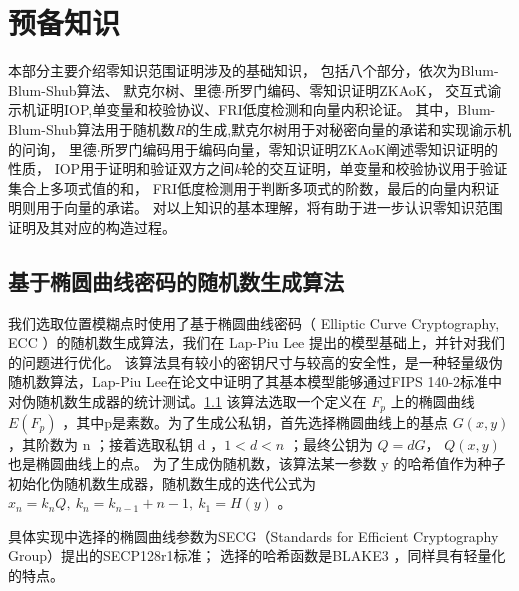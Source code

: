 \documentclass[zihao=-4]{ctexart}
\begin{document}

\section{预备知识}
本部分主要介绍零知识范围证明涉及的基础知识，
包括八个部分，依次为Blum-Blum-Shub算法、
默克尔树、里德$\cdot$所罗门编码、零知识证明ZKAoK，
交互式谕示机证明IOP,单变量和校验协议、FRI低度检测和向量内积论证。
其中，Blum-Blum-Shub算法用于随机数$R$的生成,默克尔树用于对秘密向量的承诺和实现谕示机的问询，
里德$\cdot$所罗门编码用于编码向量，零知识证明ZKAoK阐述零知识证明的性质，
IOP用于证明和验证双方之间$k$轮的交互证明，单变量和校验协议用于验证集合上多项式值的和，
FRI低度检测用于判断多项式的阶数，最后的向量内积证明则用于向量的承诺。
对以上知识的基本理解，将有助于进一步认识零知识范围证明及其对应的构造过程。
\subsection{基于椭圆曲线密码的随机数生成算法}
我们选取位置模糊点时使用了基于椭圆曲线密码（ Elliptic Curve Cryptography, ECC ）的随机数生成算法，我们在 Lap-Piu Lee 提出的模型基础上，并针对我们的问题进行优化。
该算法具有较小的密钥尺寸与较高的安全性，是一种轻量级伪随机数算法，Lap-Piu Lee在论文中证明了其基本模型能够通过FIPS 140-2标准中对伪随机数生成器的统计测试。\ref{}
该算法选取一个定义在 $F_p$ 上的椭圆曲线 $E(F_p)$ ，其中p是素数。为了生成公私钥，首先选择椭圆曲线上的基点 $G(x,y)$，其阶数为 n ；接着选取私钥 d ，$1<d<n$ ；最终公钥为 $Q=dG$， $Q(x,y)$也是椭圆曲线上的点。
为了生成伪随机数，该算法某一参数 y 的哈希值作为种子初始化伪随机数生成器，随机数生成的迭代公式为 $x_n=k_nQ,\ k_n=k_{n-1}+n-1,\ k_1=H(y)$ 。
\par
具体实现中选择的椭圆曲线参数为SECG（Standards for Efficient Cryptography Group）提出的SECP128r1标准；
选择的哈希函数是BLAKE3 ，同样具有轻量化的特点。
\end{document}
